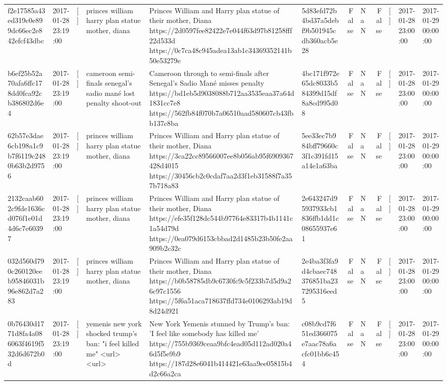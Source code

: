\begin{tabular}{llllllrlrlll}
f2e17585a43ed319c0e899dc66ec2e842efcf43dbc & 2017-01-28 23:19:00 & [] & princes william harry plan statue mother, diana & Princes William and Harry plan statue of their mother, Diana https://2d0597fee82422e7e044f63d97b81258fff22d533d https://0c7ca48c945adea13ab1c34369352141b50e53279e & 5d83efd72b4bd37a5debf9b501945cdb360acb5e28 & False & NaN & False & [] & 2017-01-28 23:00:00 & 2017-01-29 00:00:00 \\
b6ef25b52a70afa6ffc178dd0fca92cb386802d6e4 & 2017-01-28 23:19:00 & [] & cameroon semi-finals senegal's sadio mané lost penalty shoot-out & Cameroon through to semi-finals after Senegal’s Sadio Mané misses penalty https://bd1eb5d9038088b712aa3535eaa37a64d1831cc7e8 https://562fb84f070b7a06510aad580607cb43fbb137c8ba & 4bc171f972e65dc8033b584399d15df8a8cd995d08 & False & NaN & False & [] & 2017-01-28 23:00:00 & 2017-01-29 00:00:00 \\
62b57e3dae6cb198a1c9b7f6119c2480b63b2d9756 & 2017-01-28 23:19:00 & [] & princes william harry plan statue mother, diana & Princes William and Harry plan statue of their mother, Diana https://3ca22cc89566007ee8b056ab95f6909367428d4015 https://30456cb2c0cdaf7aa2d3f1eb31588f7a357b718a83 & 5ee33ec7b984bff79660c3f1c391fd15a14e1a63ba & False & NaN & False & [] & 2017-01-28 23:00:00 & 2017-01-29 00:00:00 \\
2132caab602c9fde1636cd076f1e01d4d6c7e60397 & 2017-01-28 23:19:00 & [] & princes william harry plan statue mother, diana & Princes William and Harry plan statue of their mother, Diana https://efe35f128dc544b97764e83317b4b1141c1a54d79d https://0ea079d6153cbbad2d1485b23b50fe2aa909b2c32c & 2e643247d95937933cb1836ffb1dd1c08655937e61 & False & NaN & False & [] & 2017-01-28 23:00:00 & 2017-01-29 00:00:00 \\
032d560d790c260120eeb95846031b96e862d7a283 & 2017-01-28 23:19:00 & [] & princes william harry plan statue mother, diana & Princes William and Harry plan statue of their mother, Diana https://b0b58785db9c6730fc9c5f233b7d5d9a26c97c1556 https://5f6a51aca718637ffd734e0106293ab19d8d24d921 & 2e4ba3f3fa9d4cbaec748376851ba237295316eed5 & False & NaN & False & [] & 2017-01-28 23:00:00 & 2017-01-29 00:00:00 \\
0b76430d1771d8fa4a086063f4619f532d6d672b0d & 2017-01-28 23:19:00 & [] & yemenis new york shocked trump's ban: "i feel killed me" <url> <url> & New York Yemenis stunned by Trump's ban: 'I feel like somebody has killed me' https://755b9369ceaa9bfc4ead05d112ad020a46d5f5e9b9 https://187d28e6041b414421e63aa9ee05815b4d2c66a2ca & c08b9cd7f651ed366075e7aac78a6acfc01bb6c454 & False & NaN & False & [] & 2017-01-28 23:00:00 & 2017-01-29 00:00:00 \\

\end{tabular}
